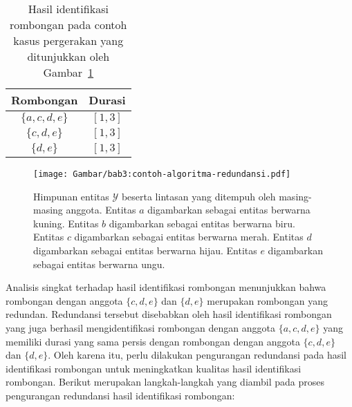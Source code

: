\begin{table}[h]
    \centering
    \captionsetup{width=0.6\textwidth}
    \caption{Hasil identifikasi rombongan pada contoh kasus pergerakan yang ditunjukkan oleh Gambar~\ref{bab3:contoh-algoritma-redundansi}}
    \begin{tabular}{|c|c|}
        \hline
        Rombongan & Durasi \\
        \hline
        $\{ a, c, d, e \}$ & $[1, 3]$ \\
        $\{ c, d, e \}$ & $[1, 3]$ \\
        $\{ d, e \}$ & $[1, 3]$ \\
        \hline
    \end{tabular}
    \label{bab6:contoh-identifikasi-redundan}
\end{table}

\begin{figure}[b!]
    \centering
    \captionsetup{width=0.7\textwidth}
    \texttt{[image: Gambar/bab3:contoh-algoritma-redundansi.pdf]}
    \caption[Contoh proses algoritma pengurangan redundansi]{Himpunan entitas $\mathcal{Y}$ beserta lintasan yang ditempuh oleh masing-masing anggota. Entitas $a$ digambarkan sebagai entitas berwarna kuning. Entitas $b$ digambarkan sebagai entitas berwarna biru. Entitas $c$ digambarkan sebagai entitas berwarna merah. Entitas $d$ digambarkan sebagai entitas berwarna hijau. Entitas $e$ digambarkan sebagai entitas berwarna ungu.}
    \label{bab3:contoh-algoritma-redundansi}
\end{figure}

Analisis singkat terhadap hasil identifikasi rombongan menunjukkan bahwa rombongan dengan anggota $\{ c, d, e \}$ dan $\{ d, e \}$ merupakan rombongan yang redundan. Redundansi tersebut disebabkan oleh hasil identifikasi rombongan yang juga berhasil mengidentifikasi rombongan dengan anggota $\{ a, c, d, e \}$ yang memiliki durasi yang sama persis dengan rombongan dengan anggota $\{ c, d, e \}$ dan $\{ d, e \}$. Oleh karena itu, perlu dilakukan pengurangan redundansi pada hasil identifikasi rombongan untuk meningkatkan kualitas hasil identifikasi rombongan. Berikut merupakan langkah-langkah yang diambil pada proses pengurangan redundansi hasil identifikasi rombongan:

